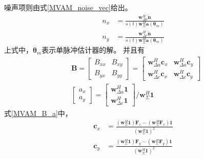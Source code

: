 \documentclass[master]{thesis-uestc}
\begin{document}
噪声项则由式\eqref{MVAM_noise_vec}给出。
\begin{subequations}\label{MVAM_noise_vec}
    \begin{align}
        n_x &= \frac{\bm{w}^H_{\Delta a}\tilde{\bm{n}}}{s(t)\bm{w}^H_\Sigma\bm{a}(\bm{\theta}_m)} \\
        n_y &= \frac{\bm{w}^H_{\Delta e}\tilde{\bm{n}}}{s(t)\bm{w}^H_\Sigma\bm{a}(\bm{\theta}_m)}
    \end{align}
\end{subequations}
上式中，$\bm{\theta}_m$表示单脉冲估计器的解。
并且有
\begin{subequations}\label{MVAM_B_a}
    \begin{align}
        &\bm{B} = 
        \begin{bmatrix}
            B_{xx} & B_{xy} \\
            B_{yx} & B_{yy}
        \end{bmatrix} = 
        \begin{bmatrix}
            \bm{w}^H_{\Delta a}\bm{c}_x & \bm{w}^H_{\Delta a}\bm{c}_y \\
            \bm{w}^H_{\Delta e}\bm{c}_x & \bm{w}^H_{\Delta e}\bm{c}_y
        \end{bmatrix} \\
        &\begin{bmatrix}
            a_x \\ a_y
        \end{bmatrix}
        =
        \begin{bmatrix}
            \bm{w}^H_{\Delta a}\textbf{1} \\ \bm{w}^H_{\Delta e}\textbf{1}
        \end{bmatrix} / \bm{w}^H_\Sigma\textbf{1}
    \end{align}
\end{subequations}
式\eqref{MVAM_B_a}中，
\begin{subequations}\label{MVAM_c_vec}
    \begin{align}
        \bm{c}_x &= \frac{\left(\bm{w}^H_\Sigma\textbf{1}\right)\bm{F}_x-
                            \left(\bm{w}^H_\Sigma\bm{F}_x\right)\textbf{1}}
                         {\left(\bm{w}^H_\Sigma\textbf{1}\right)^2} \\
        \bm{c}_y &= \frac{\left(\bm{w}^H_\Sigma\textbf{1}\right)\bm{F}_y-
                            \left(\bm{w}^H_\Sigma\bm{F}_y\right)\textbf{1}}
                         {\left(\bm{w}^H_\Sigma\textbf{1}\right)^2} \\
    \end{align}
\end{subequations}
\end{document}
